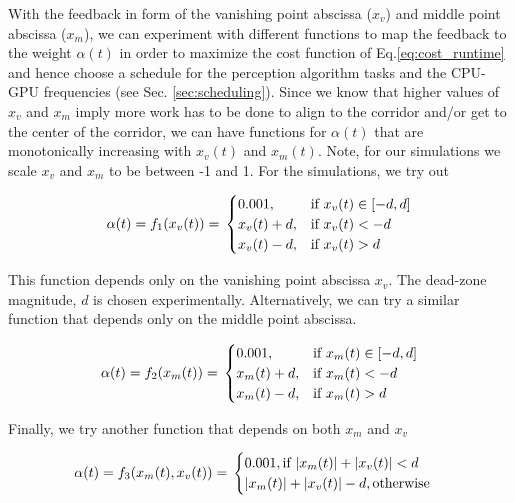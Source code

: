 With the feedback in form of the vanishing point abscissa ($x_v$) and middle point abscissa ($x_m$), we can experiment with different functions to map the feedback to the weight $\alpha(t)$ in order to maximize the cost function of Eq.\ref{eq:cost_runtime} and hence choose a schedule for the perception algorithm tasks and the CPU-GPU frequencies (see Sec. \ref{sec:scheduling}). 
Since we know that higher values of $x_v$ and $x_m$ imply more work has to be done to align to the corridor and/or get to the center of the corridor, we can have functions for $\alpha(t)$ that are monotonically increasing with $x_v(t)$ and $x_m(t)$. Note, for our simulations we scale $x_v$ and $x_m$ to be between -1 and 1. For the simulations, we try out

{\footnotesize{
\begin{equation}
\alpha(t) = f_1(x_v(t)) = \\
\begin{cases}
0.001,&\text{if }x_v(t)\in[-d,d]\\
x_v(t)+d,&\text{if }x_v(t)<-d\\
x_v(t)-d,&\text{if }x_v(t)>d
\end{cases}
\label{eq:f1}
\end{equation}
}}


This function depends only on the vanishing point abscissa $x_v$. The dead-zone magnitude, $d$ is chosen experimentally. Alternatively, we can try a similar function that depends only on the middle point abscissa.

{\footnotesize{
\begin{equation}
\alpha(t) = f_2(x_m(t)) = \\
\begin{cases}
0.001,&\text{if }x_m(t)\in[-d,d]\\
x_m(t)+d,&\text{if }x_m(t)<-d\\
x_m(t)-d,&\text{if }x_m(t)>d
\end{cases}
\label{eq:f2}
\end{equation}
}}

Finally, we try another function that depends on both $x_m$ and $x_v$

{\footnotesize{
\begin{equation}
\alpha(t) = f_3(x_m(t),x_v(t)) = \\
\begin{cases}
0.001,\text{if }|x_m(t)|+|x_v(t)|<d\\
|x_m(t)|+|x_v(t)|-d,\text{otherwise}\\
\end{cases}
\label{eq:f2}
\end{equation}
}}








